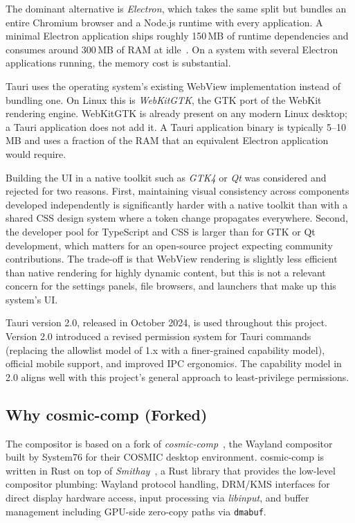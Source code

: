 The dominant alternative is \emph{Electron}, which takes the same split but
bundles an entire Chromium browser and a Node.js runtime with every application.
A minimal Electron application ships roughly 150\,MB of runtime dependencies and
consumes around 300\,MB of RAM at idle~\cite{electron:overhead}. On a system
with several Electron applications running, the memory cost is substantial.

Tauri uses the operating system's existing WebView implementation instead of
bundling one. On Linux this is \emph{WebKitGTK}, the GTK port of the WebKit
rendering engine. WebKitGTK is already present on any modern Linux desktop; a
Tauri application does not add it. A Tauri application binary is typically
5--10\,MB and uses a fraction of the RAM that an equivalent Electron application
would require.

Building the UI in a native toolkit such as \emph{GTK4} or \emph{Qt} was
considered and rejected for two reasons. First, maintaining visual consistency
across components developed independently is significantly harder with a native
toolkit than with a shared CSS design system where a token change propagates
everywhere. Second, the developer pool for TypeScript and CSS is larger than
for GTK or Qt development, which matters for an open-source project expecting
community contributions. The trade-off is that WebView rendering is slightly
less efficient than native rendering for highly dynamic content, but this is not
a relevant concern for the settings panels, file browsers, and launchers that
make up this system's UI.

Tauri version 2.0, released in October 2024, is used throughout this project.
Version 2.0 introduced a revised permission system for Tauri commands (replacing
the allowlist model of 1.x with a finer-grained capability model), official
mobile support, and improved IPC ergonomics. The capability model in 2.0 aligns
well with this project's general approach to least-privilege permissions.

\subsection{Why cosmic-comp (Forked)}
\label{sec:compositor-intro}

The compositor is based on a fork of \emph{cosmic-comp}~\cite{cosmic:comp},
the Wayland compositor built by System76 for their COSMIC desktop environment.
cosmic-comp is written in Rust on top of \emph{Smithay}~\cite{smithay}, a Rust
library that provides the low-level compositor plumbing: Wayland protocol
handling, DRM/KMS interfaces for direct display hardware access, input
processing via \emph{libinput}, and buffer management including GPU-side
zero-copy paths via \texttt{dmabuf}.

